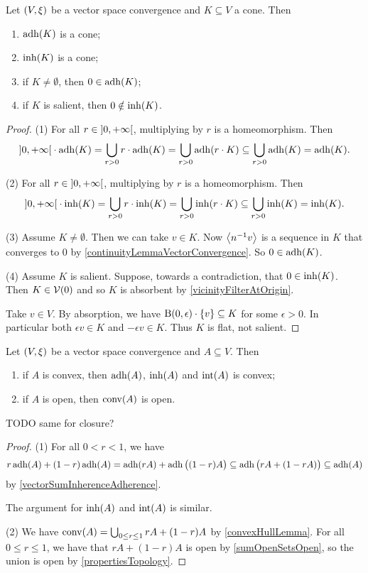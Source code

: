 \begin{proposition} \label{inherenceAdherenceCone}
Let $\sSet{V,\xi}$ be a vector space convergence and $K\subseteq V$ a cone. Then
\begin{enumerate}
\item $\operatorname{adh}(K)$ is a cone;
\item $\operatorname{inh}(K)$ is a cone;
\item if $K\neq \emptyset$, then $0\in \operatorname{adh}(K)$;
\item if $K$ is salient, then $0\notin \operatorname{inh}(K)$.
\end{enumerate}
\end{proposition}
\begin{proof}
(1) For all $r\in \interval[o]{0,+\infty}$, multiplying by $r$ is a homeomorphism. Then
\[ \interval[o]{0,+\infty}\cdot \adh(K) = \bigcup_{r> 0}r\cdot \adh(K) = \bigcup_{r>0}\adh(r\cdot K) \subseteq \bigcup_{r>0}\adh(K) = \adh(K). \]

(2) For all $r\in \interval[o]{0,+\infty}$, multiplying by $r$ is a homeomorphism. Then
\[ \interval[o]{0,+\infty}\cdot \inh(K) = \bigcup_{r> 0}r\cdot \inh(K) = \bigcup_{r>0}\inh(r\cdot K) \subseteq \bigcup_{r>0}\inh(K) = \inh(K). \]

(3) Assume $K\neq \emptyset$. Then we can take $v\in K$. Now $\left\langle n^{-1}v \right\rangle$ is a sequence in $K$ that converges to $0$ by \ref{continuityLemmaVectorConvergence}. So $0\in \operatorname{adh}(K)$.

(4) Assume $K$ is salient. Suppose, towards a contradiction, that $0\in \operatorname{inh}(K)$. Then $K\in \operatorname{\mathcal{V}}(0)$ and so $K$ is absorbent by \ref{vicinityFilterAtOrigin}.

Take $v\in V$. By absorption, we have $\operatorname{B}(0,\epsilon)\cdot\{v\} \subseteq K$ for some $\epsilon > 0$. In particular both $\epsilon v\in K$ and $-\epsilon v\in K$. Thus $K$ is flat, not salient.
\end{proof}

\begin{proposition} \label{inherenceAdherenceConvex}
Let $\sSet{V,\xi}$ be a vector space convergence and $A\subseteq V$. Then
\begin{enumerate}
\item if $A$ is convex, then $\operatorname{adh}(A)$, $\operatorname{inh}(A)$ and $\operatorname{int}(A)$ is convex;
\item if $A$ is open, then $\operatorname{conv}(A)$ is open.
\end{enumerate}
\end{proposition}
TODO same for closure?
\begin{proof}
(1) For all $0<r<1$, we have
\[ r\operatorname{adh}(A) + (1-r)\operatorname{adh}(A) = \operatorname{adh}(rA) + \operatorname{adh}\big((1-r)A\big) \subseteq \operatorname{adh}\big(rA + (1-rA)\big) \subseteq \operatorname{adh}(A) \]
by \ref{vectorSumInherenceAdherence}. 

The argument for $\operatorname{inh}(A)$ and $\operatorname{int}(A)$ is similar.

(2) We have $\operatorname{conv}(A) = \bigcup_{0\leq r\leq 1} rA + (1-r)A$ by \ref{convexHullLemma}. For all $0\leq r\leq 1$, we have that $rA + (1-r)A$ is open by \ref{sumOpenSetsOpen}, so the union is open by \ref{propertiesTopology}.
\end{proof}

